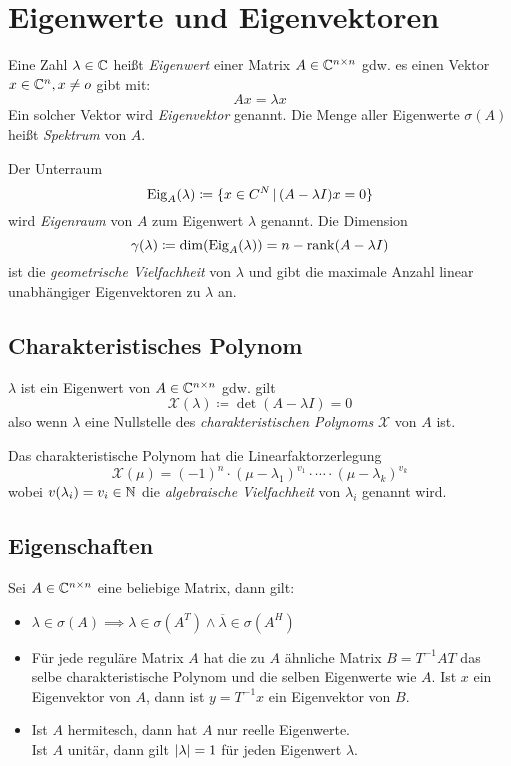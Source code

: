 	\section{Eigenwerte und Eigenvektoren}
		Eine Zahl \( \lambda \in \mathbb{C} \) heißt \textit{Eigenwert} einer Matrix \( A \in \mathbb{C}^{n \times n} \) gdw. es einen Vektor \( x \in \mathbb{C}^n, x \neq o \) gibt mit:
		\begin{equation*}
			Ax = \lambda x
		\end{equation*}
		Ein solcher Vektor wird \textit{Eigenvektor} genannt. Die Menge aller Eigenwerte \( \sigma(A) \) heißt \textit{Spektrum} von \(A\).

		Der Unterraum \[ \operatorname{Eig}_A(\lambda) \coloneqq \{ x \in C^N \,\vert\, (A - \lambda I)x = 0 \} \] wird \textit{Eigenraum} von \(A\) zum Eigenwert \(\lambda\) genannt. Die Dimension \[ \gamma(\lambda) \coloneqq \dim(\operatorname{Eig}_A(\lambda)) = n - \rank(A - \lambda I) \] ist die \textit{geometrische Vielfachheit} von \(\lambda\) und gibt die maximale Anzahl linear unabhängiger Eigenvektoren zu \(\lambda\) an.

		\subsection{Charakteristisches Polynom}
			\( \lambda \) ist ein Eigenwert von \(A \in \mathbb{C}^{n \times n} \) gdw. gilt \[ \mathcal{X}(\lambda) \coloneqq \det (A - \lambda I) = 0 \] also wenn \(\lambda\) eine Nullstelle des \textit{charakteristischen Polynoms} \(\mathcal{X}\) von \(A\) ist.

			Das charakteristische Polynom hat die Linearfaktorzerlegung \[ \mathcal{X}(\mu) = (-1)^n \cdot (\mu - \lambda_1)^{v_1} \cdot \cdots \cdot (\mu - \lambda_k)^{v_k} \] wobei \( v(\lambda_i) = v_i \in \mathbb{N} \) die \textit{algebraische Vielfachheit} von \(\lambda_i\) genannt wird.

		\subsection{Eigenschaften}
			Sei \( A \in \mathbb{C}^{n \times n} \) eine beliebige Matrix, dann gilt:
			\begin{itemize}
				\item \( \lambda \in \sigma(A) \implies \lambda \in \sigma(A^T) \land \overline{\lambda} \in \sigma(A^H) \)
				\item Für jede reguläre Matrix \(A\) hat die zu \(A\) ähnliche Matrix \( B = T^{-1} A T \) das selbe charakteristische Polynom und die selben Eigenwerte wie \(A\). Ist \(x\) ein Eigenvektor von \(A\), dann ist \( y = T^{-1} x \) ein Eigenvektor von \(B\).
				\item Ist \(A\) hermitesch, dann hat \(A\) nur reelle Eigenwerte. \\ Ist \(A\) unitär, dann gilt \( \abs{\lambda} = 1 \) für jeden Eigenwert \(\lambda\).
			\end{itemize}

